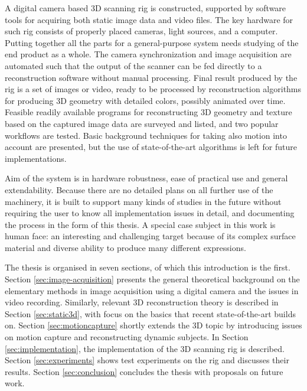 A digital camera based 3D scanning rig is constructed, supported by software tools for acquiring both static image data and video files.
The key hardware for such rig consists of properly placed cameras, light sources, and a computer.
Putting together all the parts for a general-purpose system needs studying of the end product as a whole.
The camera synchronization and image acquisition are automated such that the output of the scanner can be fed directly to a reconstruction software without manual processing.
Final result produced by the rig is a set of images or video, ready to be processed by reconstruction algorithms for producing 3D geometry with detailed colors, possibly animated over time.
Feasible readily available programs for reconstructing 3D geometry and texture based on the captured image data are surveyed and listed, and two popular workflows are tested.
Basic background techniques for taking also motion into account are presented, but the use of state-of-the-art algorithms is left for future implementations.

Aim of the system is in hardware robustness, ease of practical use and general extendability.
Because there are no detailed plans on all further use of the machinery, it is built to support many kinds of studies in the future without requiring the user to know all implementation issues in detail, and documenting the process in the form of this thesis.
A special case subject in this work is human face: an interesting and challenging target because of its complex surface material and diverse ability to produce many different expressions.

The thesis is organised in seven sections, of which this introduction is the first.
Section \ref{sec:image-acquisition} presents the general theoretical background on the elementary methods in image acquisition using a digital camera and the issues in video recording.
Similarly, relevant 3D reconstruction theory is described in Section \ref{sec:static3d}, with focus on the basics that recent state-of-the-art builds on.
Section \ref{sec:motioncapture} shortly extends the 3D topic by introducing issues on motion capture and reconstructing dynamic subjects.
In Section \ref{sec:implementation}, the implementation of the 3D scanning rig is described.
Section \ref{sec:experiments} shows test experiments on the rig and discusses their results.
Section \ref{sec:conclusion} concludes the thesis with proposals on future work.
